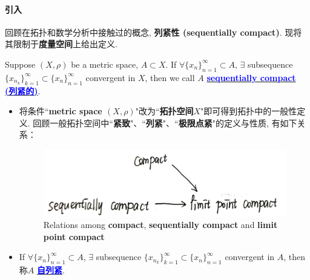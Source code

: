 \paragraph{引入}
	回顾在拓扑和数学分析中接触过的概念, \textbf{列紧性 (sequentially compact)}. 现将其限制于\textbf{度量空间}上给出定义.
	\begin{defn}\label{def 1.3.1}
		Suppose $(X , \rho)$ be a metric space, $A \subset X$. If $\forall \{ x_n \}_{n = 1}^{\infty} \subset A$, $\exists$ subsequence $\{ x_{n_k} \}_{k = 1}^{\infty} \subset \{ x_n \}_{n = 1}^{\infty}$ convergent in $X$, then we call $A$ \underline{\textcolor{blue}{\textbf{sequentially compact (列紧的)}}}.
		
		\vspace{2em}
		
		\begin{rmk}
			\begin{itemize}
				\item 将条件``\textbf{metric space $(X , \rho)$}"改为``\textbf{拓扑空间$X$}"即可得到拓扑中的一般性定义. 回顾一般拓扑空间中``\textbf{紧致}"、``\textbf{列紧}"、``\textbf{极限点紧}"的定义与性质, 有如下关系：
				
				\begin{figure}[thbp!]
					\centering
					\includegraphics[width=0.5\linewidth]{figure/1.3-1}
					\caption{Relations among \textbf{compact}, \textbf{sequentially compact} and \textbf{limit point compact}}
					\label{pic : 1.3-1} %
				\end{figure}
				
				\vspace{1em}
				
				\item If $\forall \{ x_n \}_{n = 1}^{\infty} \subset A$, $\exists$ subsequence $\{ x_{n_k} \}_{k = 1}^{\infty} \subset \{ x_n \}_{n = 1}^{\infty}$ convergent in $A$, then 称$A$ \underline{\textcolor{blue}{\textbf{自列紧}}}.
			\end{itemize}
		\end{rmk}
	\end{defn}

\vspace{5em}

